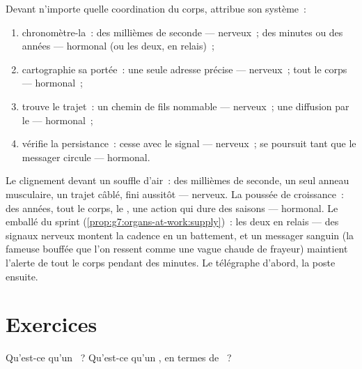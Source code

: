 \begin{method}\label{met:g8:nervous-communication:diagnose}
Devant n'importe quelle coordination du corps, attribue son système~:
\begin{enumerate}
  \item chronomètre-la~: des millièmes de seconde --- nerveux~; des
        minutes ou des années --- hormonal (ou les deux, en
        relais)~;
  \item cartographie sa portée~: une seule adresse précise ---
        nerveux~; tout le corps --- hormonal~;
  \item trouve le trajet~: un chemin de fils nommable --- nerveux~;
        une diffusion par le  --- hormonal~;
  \item vérifie la persistance~: cesse avec le signal --- nerveux~;
        se poursuit tant que le messager circule --- hormonal.
\end{enumerate}
\end{method}

\begin{example}\label{ex:g8:nervous-communication:cases}
Le clignement devant un souffle d'air~: des millièmes de seconde, un
seul anneau musculaire, un trajet câblé, fini aussitôt --- nerveux.
La poussée de croissance~: des années, tout le corps, le , une
action qui dure des saisons --- hormonal. Le  emballé du sprint
(\cref{prop:g7:organs-at-work:supply})~: les deux en relais --- des
signaux nerveux montent la cadence en un battement, et un messager
sanguin (la fameuse bouffée que l'on ressent comme une vague chaude
de frayeur) maintient l'alerte de tout le corps pendant des minutes.
Le télégraphe d'abord, la poste ensuite.
\end{example}

\section{Exercices}

\begin{exercise}[$\star$]\label{exo:g8:nervous-communication:1}
Qu'est-ce qu'un ~? Qu'est-ce qu'un , en termes de
~?
\end{exercise}

